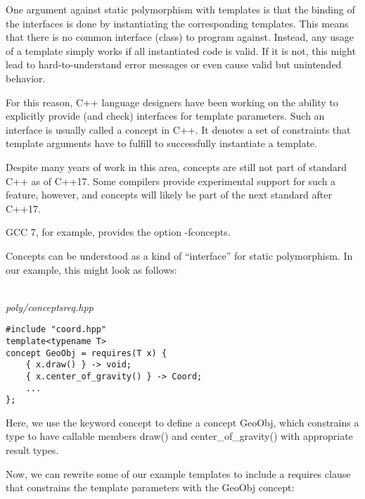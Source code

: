 One argument against static polymorphism with templates is that the binding of the interfaces is done by instantiating the corresponding templates. This means that there is no common interface (class) to program against. Instead, any usage of a template simply works if all instantiated code is valid. If it is not, this might lead to hard-to-understand error messages or even cause valid but unintended behavior.

For this reason, C++ language designers have been working on the ability to explicitly provide (and check) interfaces for template parameters. Such an interface is usually called a concept in C++.  It denotes a set of constraints that template arguments have to fulfill to successfully instantiate a template.

Despite many years of work in this area, concepts are still not part of standard C++ as of C++17. Some compilers provide experimental support for such a feature, however, and concepts will likely be part of the next standard after C++17.

\begin{tcolorbox}[colback=webgreen!5!white,colframe=webgreen!75!black]
\hspace*{0.75cm}GCC 7, for example, provides the option -fconcepts.
\end{tcolorbox}

Concepts can be understood as a kind of “interface” for static polymorphism. In our example, this might look as follows:

\hspace*{\fill} \\ %
\noindent
\textit{poly/conceptsreq.hpp}
\begin{lstlisting}[style=styleCXX]
#include "coord.hpp"
template<typename T>
concept GeoObj = requires(T x) {
	{ x.draw() } -> void;
	{ x.center_of_gravity() } -> Coord;
	...
};
\end{lstlisting}

Here, we use the keyword concept to define a concept GeoObj, which constrains a type to have callable members draw() and center\_of\_gravity() with appropriate result types.

Now, we can rewrite some of our example templates to include a requires clause that constrains the template parameters with the GeoObj concept:


